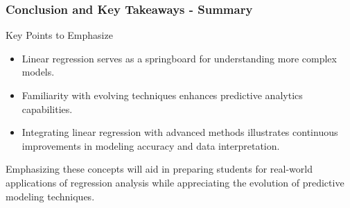 \documentclass{beamer}
\begin{document}
\begin{frame}[fragile]
    \frametitle{Conclusion and Key Takeaways - Summary}
    \begin{block}{Key Points to Emphasize}
        \begin{itemize}
            \item Linear regression serves as a springboard for understanding more complex models.
            \item Familiarity with evolving techniques enhances predictive analytics capabilities.
            \item Integrating linear regression with advanced methods illustrates continuous improvements in modeling accuracy and data interpretation.
        \end{itemize}
    \end{block}
    
    Emphasizing these concepts will aid in preparing students for real-world applications of regression analysis while appreciating the evolution of predictive modeling techniques.
\end{frame}
\end{document}
